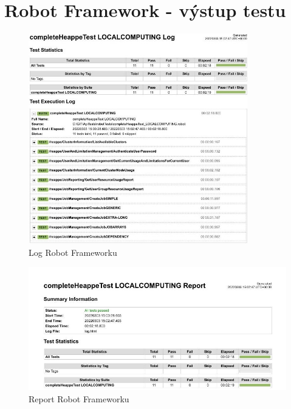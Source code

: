 \chapter{Robot Framework - výstup testu}\label{chapter:robot-framework-local-tests}
\begin{figure}[!h]
	\centering
	\includegraphics[width=0.85\textwidth]{Figures/heappe-localcomputing-log.jpg}
	\caption{Log Robot Frameworku}
    \label{fig:robotFrameworkLog}
\end{figure}

\begin{figure}[!h]
	\centering
	\includegraphics[width=1.2\textwidth, angle =90 ]{Figures/heappe-localcomputing-report.jpg}
	\caption{Report Robot Frameworku}
    \label{fig:robotFrameworkReport}
\end{figure}
